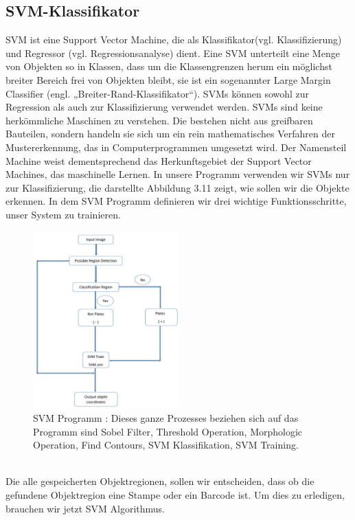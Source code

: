 \documentclass[10pt,a4paper]{report}
\begin{document}
\subsection{SVM-Klassifikator}
SVM ist eine Support Vector Machine, die als Klassifikator(vgl. Klassifizierung) und Regressor (vgl. Regressionsanalyse) dient. Eine SVM unterteilt eine Menge von Objekten so in Klassen, dass um die Klassengrenzen herum ein möglichst breiter Bereich frei von Objekten bleibt, sie ist ein sogenannter Large Margin Classifier (engl. „Breiter-Rand-Klassifikator“). SVMs können sowohl zur Regression als auch zur Klassifizierung verwendet werden\cite{4}.
SVMs sind keine herkömmliche Maschinen zu verstehen. Die bestehen  nicht aus greifbaren Bauteilen, sondern handeln sie sich um ein rein mathematisches Verfahren der Mustererkennung, das in Computerprogrammen umgesetzt wird. Der Namensteil Machine weist dementsprechend das Herkunftsgebiet der Support Vector Machines, das maschinelle Lernen.
In unsere Programm verwenden wir SVMs nur zur Klassifizierung, die darstellte Abbildung 3.11 zeigt, wie sollen wir die Objekte erkennen. In dem SVM Programm definieren wir drei wichtige Funktionsschritte, unser System zu trainieren.\\
\begin{figure}[htbp] 
	\centering
	\includegraphics[width=0.5\textwidth]{SVM.png}
	\caption{SVM Programm : Dieses ganze Prozesses beziehen sich auf das Programm sind Sobel Filter, Threshold Operation, Morphologic Operation, Find Contours, SVM Klassifikation, SVM Training.}
	\label{fig:Bild 3.11}
\end{figure}\\
Die alle gespeicherten Objektregionen, sollen wir entscheiden, dass ob die gefundene Objektregion eine Stampe oder ein Barcode ist. Um dies zu erledigen, brauchen wir jetzt SVM Algorithmus. 
\end{document}
